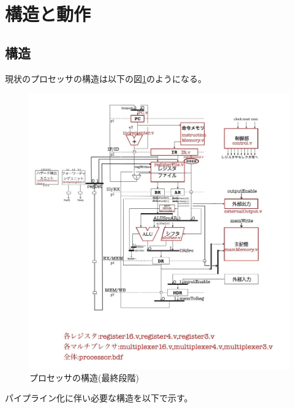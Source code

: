 \documentclass[a4j,titlepage]{jarticle}
\begin{document}
\section{構造と動作}

\subsection{構造}

現状のプロセッサの構造は以下の図\ref{structure0506}のようになる。

\begin{figure}[H]
    \begin{center}
     \includegraphics[scale = 0.22]{structure0526.jpg}
     \end{center}
     \caption{プロセッサの構造(最終段階)}
     \label{structure0506}
 \end{figure}

パイプライン化に伴い必要な構造を以下で示す。
\end{document}
